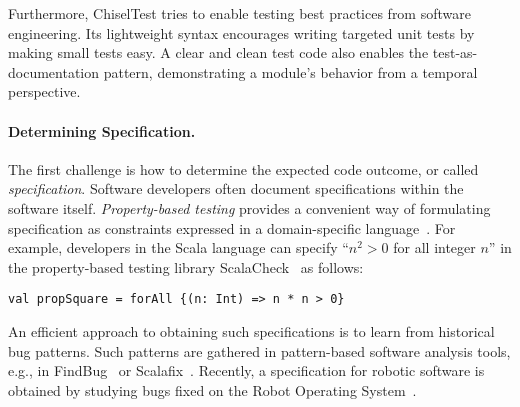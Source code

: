 \documentclass[fleqn,12pt]{article}
\begin{document}
Furthermore, ChiselTest tries to enable testing best practices from software engineering.
Its lightweight syntax encourages writing targeted unit tests by making small tests easy.
A clear and clean test code also enables the test-as-documentation pattern,
demonstrating a module's behavior from a temporal perspective.

\paragraph{Determining Specification.}
The first challenge is how to determine the expected code outcome, or
called \emph{specification}.  Software developers often document
specifications within the software itself.  \emph{Property-based testing}
provides a convenient way of formulating specification as constraints
expressed in a domain-specific
language~\cite{DBLP:conf/icfp/ClaessenH00}.  For example, developers
in the Scala language can specify ``$n^2>0$ for all integer $n$'' in the
property-based testing library ScalaCheck~\cite{nilsson2014scalacheck}
as follows:
\begin{lstlisting}[numbers=none]
val propSquare = forAll {(n: Int) => n * n > 0}
\end{lstlisting}
An efficient approach to obtaining such specifications is to learn from
historical bug patterns. Such patterns are gathered in pattern-based
software analysis tools, e.g., in
FindBug~\cite{DBLP:conf/paste/AyewahPMPZ07} or
Scalafix~\cite{web:scalafix}.  Recently, a specification for robotic
software is obtained by studying bugs fixed on the Robot
Operating System~\cite{nielsenFSW2020dependencybugs}.






\end{document}
